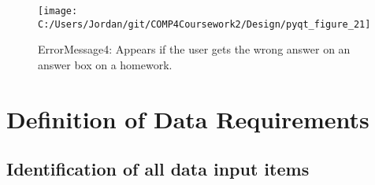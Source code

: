 \begin{figure}[H]
    \label{fig:print_function_result}\caption{ErrorMessage4: Appears if the user gets the wrong answer on an answer box on a homework.}
    \texttt{[image: C:/Users/Jordan/git/COMP4Coursework2/Design/pyqt\_figure\_21]}
\end{figure}

\section{Definition of Data Requirements}

\subsection{Identification of all data input items}

